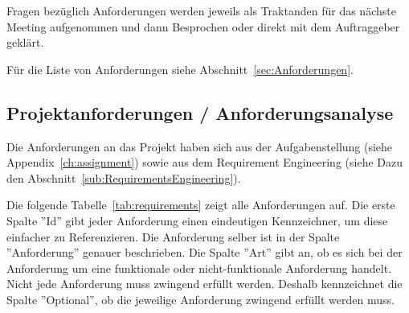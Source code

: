 Fragen bezüglich Anforderungen werden jeweils als Traktanden für das nächste Meeting aufgenommen und dann Besprochen oder direkt mit dem Auftraggeber geklärt.

Für die Liste von Anforderungen siehe Abschnitt~\ref{sec:Anforderungen}.


\subsection{Projektanforderungen / Anforderungsanalyse}
\label{sub:Anforderungen}

Die Anforderungen an das Projekt haben sich aus der Aufgabenstellung (siehe Appendix~\ref{ch:assignment}) sowie aus dem Requirement Engineering (siehe Dazu den Abschnitt~\ref{sub:RequirementsEngineering}).

Die folgende Tabelle~\ref{tab:requirements} zeigt alle Anforderungen auf.
Die erste Spalte ''Id'' gibt jeder Anforderung einen eindeutigen Kennzeichner, um diese einfacher zu Referenzieren.
Die Anforderung selber ist in der Spalte ''Anforderung'' genauer beschrieben.
Die Spalte ''Art'' gibt an, ob es sich bei der Anforderung um eine funktionale oder nicht-funktionale Anforderung handelt.
Nicht jede Anforderung muss zwingend erfüllt werden. Deshalb kennzeichnet die Spalte ''Optional'', ob die jeweilige Anforderung zwingend erfüllt werden muss.

